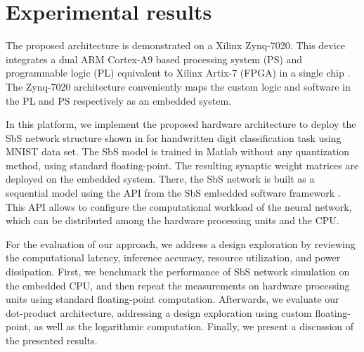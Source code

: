 \section{Experimental results}
\label{sec:experimental_results}
The proposed architecture is demonstrated on a Xilinx Zynq-7020. This device integrates a dual ARM Cortex-A9 based processing system (PS) and programmable logic (PL) equivalent to Xilinx Artix-7 (FPGA) in a single chip \cite{xilinx2015zynq}. The Zynq-7020 architecture conveniently maps the custom logic and software in the PL and PS respectively as an embedded system.

In this platform, we implement the proposed hardware architecture to deploy the SbS network structure shown in  for handwritten digit classification task using MNIST data set. The SbS model is trained in Matlab without any quantization method, using standard floating-point. The resulting synaptic weight matrices are deployed on the embedded system. There, the SbS network is built as a sequential model using the API from the SbS embedded software framework \cite{nevarez2020accelerator}. This API allows to configure the computational workload of the neural network, which can be distributed among the hardware processing units and the CPU.

For the evaluation of our approach, we address a design exploration by reviewing the computational latency, inference accuracy, resource utilization, and power dissipation. First, we benchmark the performance of SbS network simulation on the embedded CPU, and then repeat the measurements on hardware processing units using standard floating-point computation. Afterwards, we evaluate our dot-product architecture, addressing a design exploration using custom floating-point, as well as the logarithmic computation. Finally, we present a discussion of the presented results.

